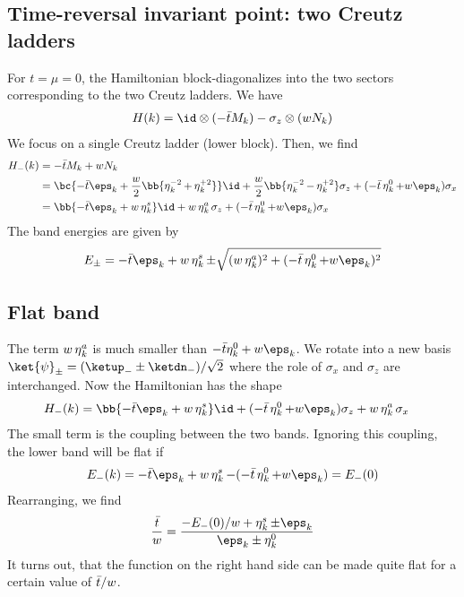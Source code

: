 \subsection{Time-reversal invariant point: two Creutz ladders}
For $t=\mu=0$, the Hamiltonian block-diagonalizes into the two sectors corresponding to the two Creutz ladders. We have
\begin{align}
    H(k) = \id \otimes (-\tbar M_k) - \sigma_z \otimes (w N_k)
\end{align}
We focus on a single Creutz ladder (lower block). Then, we find
\begin{align}
    H_-(k) &= -\tbar M_k + w N_k \\
           &= \bc{-\tbar \eps_k + \frac{w}{2} \bb{\et^{-2}_k + \et^{+2}_k}}\id + \frac{w}{2}\bb{\et^{-2}_k - \et^{+2}_k} \sigma_z + (-\tbar \et^0_k + w \eps_k) \sigma_x \\
           &= \bb{-\tbar \eps_k + w \et^{s}_k} \id + w\et^{a}_k \sigma_z + (-\tbar \et^0_k + w \eps_k) \sigma_x
\end{align}
The band energies are given by
\begin{align}
    E_\pm = -\tbar \eps_k + w \et^s_k \pm \sqrt{(w \et^a_k)^2+(-\tbar\et^0_k+w\eps_k)^2}
\end{align}

\subsection{Flat band}
The term $w \operatorname{\eta}^a_k$ is much smaller than $-\tbar\eta_k^0+w \eps_k$. We rotate into a new basis
$\ket{\psi}_\pm = (\ketup_- \pm \ketdn_-)/\sqrt{2}$ where the role of $\sigma_x$ and $\sigma_z$ are interchanged. Now the Hamiltonian has the shape
\begin{align}
    H_-(k) &= \bb{ -\tbar \eps_k + w \et^{s}_k }\id +(-\tbar \et^0_k + w \eps_k) \sigma_z +  w\et^{a}_k \sigma_x
\end{align}
The small term is the coupling between the two bands. Ignoring this coupling, the lower band will be flat if
\begin{align}
    E_-(k) = -\tbar \eps_k + w \et^s_k - (-\tbar \et^0_k + w \eps_k) = E_-(0)
\end{align}
Rearranging, we find
\begin{align}
    \frac{\tbar}{w} = \frac{-E_-(0)/w + \et^s_k \pm \eps_k}{\eps_k \pm \et^0_k}
\end{align}
It turns out, that the function on the right hand side can be made quite flat for a certain value of $\bar{t}/w$.


